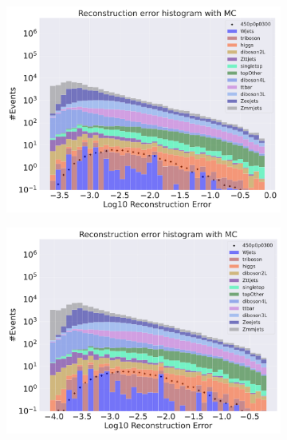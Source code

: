 \begin{figure}[H]
    \centering
    \begin{subfigure}{.45\textwidth}
        \includegraphics[width=\textwidth]{Figures/AE_testing/big/3lep/b_data_recon_big_rm3_feats_sig_450p0p0300.pdf}
        \caption{ }
        \label{fig:AE_3lep_big_450}
    \end{subfigure}
    \hfill
    \begin{subfigure}{.45\textwidth}
        \includegraphics[width=\textwidth]{Figures/AE_testing/small/3lep/b_data_recon_big_rm3_feats_sig_450p0p0300.pdf}
        \caption{}
        \label{fig:AE_3lep_small_450}
    \end{subfigure}
    \hfill
    \begin{subfigure}{.45\textwidth}

\end{subfigure}
\end{figure}
